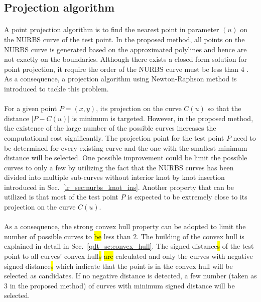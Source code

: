 \subsection{Projection algorithm}
\paragraph{}
A point projection algorithm is to find the nearest point in parameter $(u)$ on the NURBS curve of the test point.
In the proposed method, all points on the NURBS curve is generated based on the approximated polylines and hence are not exactly on the boundaries.
Although there exists a closed form solution for point projection, it require the order of the NURBS curve must be less than $4$ \citep{Pie1997}.
As a consequence, a projection algorithm \citep{MA200379} using Newton-Raphson method is introduced to tackle this problem.

\paragraph{}
For a given point $P=(x,y)$, its projection on the curve $C(u)$ so that the distance $|P-C(u)|$ is minimum is targeted.
However, in the proposed method, the existence of the large number of the possible curves increases the computational cost significantly.
The projection point for the test point $P$ need to be determined for every existing curve and the one with the smallest minimum distance will be selected.
One possible improvement could be limit the possible curves to only a few by utilizing the fact that the NURBS curves has been divided into multiple sub-curves without interior knot by knot insertion introduced in Sec.~\ref{lr_sec:nurbs_knot_ins}.
Another property that can be utilized is that most of the test point $P$ is expected to be extremely close to its projection on the curve $C(u)$.

\paragraph{}
As a consequence, the strong convex hull property can be adopted to limit the number of possible curves to \hl{be} less than $2$.
The building of the convex hull is explained in detail in Sec.~\ref{qdt_sc:convex_hull}.
The signed distance\hl{s} of the test point to all curves' convex hull\hl{s} \hl{are} calculated and only the curves with negative signed distance\hl{s} which indicate that the point is in the convex hull will be selected as candidates.
If no negative distance is detected, a few number (taken as $3$ in the proposed method) of curves with minimum signed distance will be selected.

